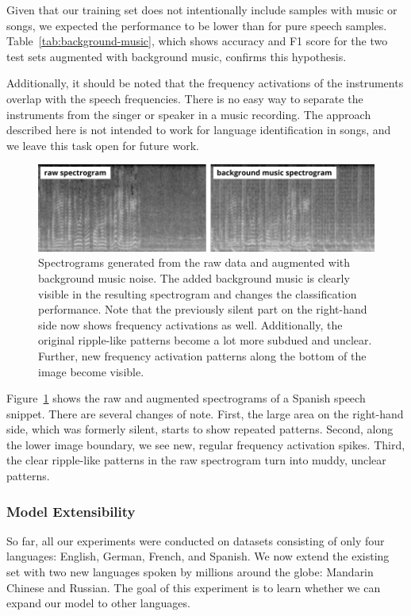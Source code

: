 	
Given that our training set does not intentionally include samples with music or songs, we expected the performance to be lower than for pure speech samples. Table~\ref{tab:background-music}, which shows accuracy and F1 score for the two test sets augmented with background music, confirms this hypothesis.

Additionally, it should be noted that the frequency activations of the instruments overlap with the speech frequencies. There is no easy way to separate the instruments from the singer or speaker in a music recording. The approach described here is not intended to work for language identification in songs, and we leave this task open for future work. 
%
	\begin{figure}[tp]
  		\centering
    	\includegraphics{img/background_music.pdf}
    	\caption{Spectrograms generated from the raw data and augmented with background music noise. The added background music is clearly visible in the resulting spectrogram and changes the classification performance. Note that the previously silent part on the right-hand side now shows frequency activations as well. Additionally, the original ripple-like patterns become a lot more subdued and unclear. Further, new frequency activation patterns along the bottom of the image become visible.}
    	\label{fig:background_music}
	\end{figure}
%

Figure~\ref{fig:background_music} shows the raw and augmented spectrograms of a Spanish speech snippet.
There are several changes of note. First, the large area on the right-hand side, which was formerly silent, starts to show repeated patterns. Second, along the lower image boundary, we see new, regular frequency activation spikes. Third, the clear ripple-like patterns in the raw spectrogram turn into muddy, unclear patterns.

\subsubsection{Model Extensibility}
\label{sec:extensibility}
So far, all our experiments were conducted on datasets consisting of only four languages: English, German, French, and Spanish. We now extend the existing set with two new languages spoken by millions around the globe: Mandarin Chinese and Russian. The goal of this experiment is to learn whether we can expand our model to other languages.

